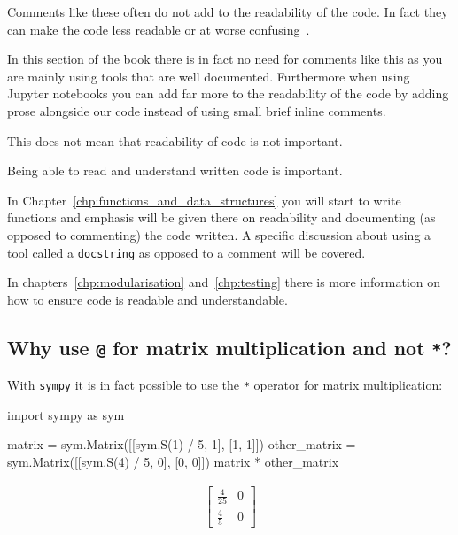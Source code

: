 Comments like these often do not add to the readability of the code. In fact
they can make the code less readable or at worse
confusing~\cite{martin2009clean}.

In this section of the book there is in fact no need for comments like this as
you are mainly using tools that are well documented. Furthermore when using
Jupyter notebooks you can add far more to the readability of the code by adding
prose alongside our code instead of using small brief inline comments.

This does not mean that readability of code is not important.


\begin{note}
Being able to read and understand written code is important.
\end{note}



In Chapter~\ref{chp:functions_and_data_structures}
you will start to write functions and emphasis will
be given there on readability and documenting (as opposed to commenting) the
code written. A specific discussion about using a tool called a
\texttt{docstring} as opposed to a comment will be covered.


In chapters~\ref{chp:modularisation} and~\ref{chp:testing} there is more
information on how to ensure code is readable and understandable.


\subsection{Why use \texttt{@} for matrix multiplication and not \texttt{*}?}
\label{\detokenize{tools-for-mathematics/04-matrices/why/main:why-do-we-use-for-matrix-multiplication-and-not}}

With \texttt{sympy} it is in fact possible to use the \texttt{*} operator for matrix
multiplication:

\begin{pyin}
import sympy as sym

matrix = sym.Matrix([[sym.S(1) / 5, 1], [1, 1]])
other_matrix = sym.Matrix([[sym.S(4) / 5, 0], [0, 0]])
matrix * other_matrix
\end{pyin}




\begin{equation*}
\begin{split}\displaystyle \left[\begin{matrix}\frac{4}{25} & 0\\\frac{4}{5} & 0\end{matrix}\right]\end{split}
\end{equation*}




